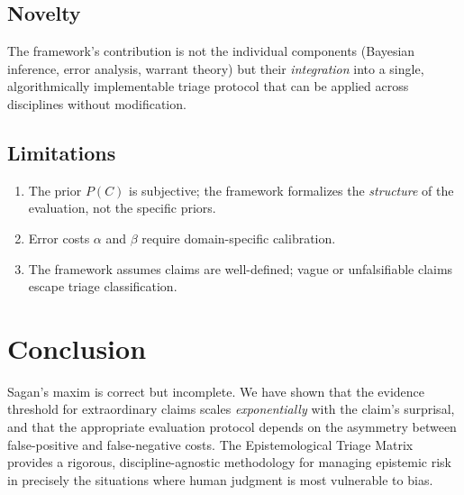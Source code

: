\documentclass[12pt, a4paper]{article}
\theoremstyle{plain}
\theoremstyle{definition}
\begin{document}
\subsection{Novelty}

The framework's contribution is not the individual components (Bayesian
inference, error analysis, warrant theory) but their \emph{integration}
into a single, algorithmically implementable triage protocol that can
be applied across disciplines without modification.

\subsection{Limitations}
\begin{enumerate}
  \item The prior $P(C)$ is subjective; the framework formalizes the
    \emph{structure} of the evaluation, not the specific priors.
  \item Error costs $\alpha$ and $\beta$ require domain-specific
    calibration.
  \item The framework assumes claims are well-defined; vague or
    unfalsifiable claims escape triage classification.
\end{enumerate}

\section{Conclusion}\label{sec:conclusion}

Sagan's maxim is correct but incomplete. We have shown that the
evidence threshold for extraordinary claims scales \emph{exponentially}
with the claim's surprisal, and that the appropriate evaluation
protocol depends on the asymmetry between false-positive and
false-negative costs. The Epistemological Triage Matrix provides a
rigorous, discipline-agnostic methodology for managing epistemic risk
in precisely the situations where human judgment is most vulnerable
to bias.


\vspace{2em}
\noindent\hrulefill
\vspace{1em}







\vspace{3em}
\noindent\hrulefill
\vspace{1em}
\end{document}
